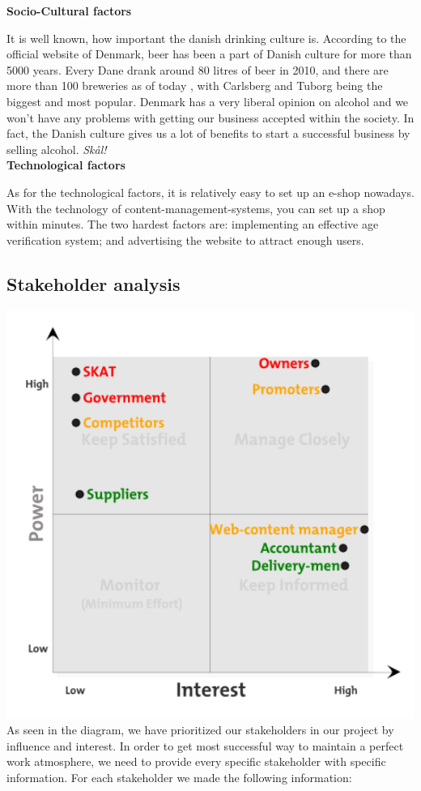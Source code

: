 \documentclass[12p]{article}
\begin{document}
\textbf{Socio-Cultural factors}

It is well known, how important the danish drinking culture is. According to the official website of Denmark, beer has been a part of Danish culture for more than 5000 years. Every Dane drank around 80 litres of beer in 2010, and there are more than 100 breweries as of today \cite{PEST_BeerInDenmark}, with Carlsberg and Tuborg being the biggest and most popular. Denmark has a very liberal opinion on alcohol and we won't have any problems with getting our business accepted within the society. In fact, the Danish culture gives us a lot of benefits to start a successful business by selling alcohol. \emph{Skål!} \\

\textbf{Technological factors}

As for the technological factors, it is relatively easy to set up an e-shop nowadays. With the technology of content-management-systems, you can set up a shop within minutes. The two hardest factors are: implementing an effective age verification system; and advertising the website to attract enough users.

\newpage


\subsection{Stakeholder analysis} \label{StakeholderAnalysis}

\includegraphics[width=1\textwidth]{stakeholder}\\
As seen in the diagram, we have prioritized our stakeholders in our project by influence and interest. In order to get most successful way to maintain a perfect work atmosphere, we need to provide every specific stakeholder with specific information. For each stakeholder we made the following information: 
\end{document}
